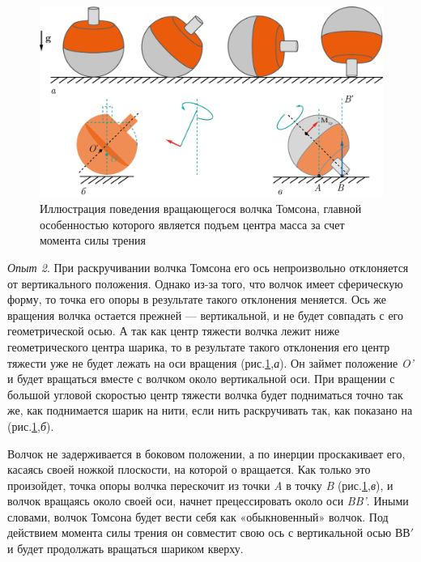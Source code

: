 \documentclass[14pt,a4paper,oneside]{extarticle}	%
\begin{document}
					\begin{figure}[H] 	
						\centering 	
						\includegraphics[width=0.9\linewidth]{gyro-7.png}
						\caption{Иллюстрация поведения вращающегося волчка Томсона, главной особенностью которого является подъем центра масса за счет момента силы трения}
						\label{gyro-7}
					\end{figure}
								
			\textit{Опыт 2}. При раскручивании волчка Томсона его ось непроизвольно отклоняется от вертикального положения.
			Однако из-за того, что волчок имеет сферическую форму, то точка его опоры в результате такого отклонения меняется.
			Ось же вращения волчка остается прежней — вертикальной, и не будет совпадать с его геометрической осью. 
			А так как центр тяжести волчка лежит ниже геометрического центра шарика, то в результате такого отклонения его центр тяжести уже не будет лежать на оси вращения (рис.\ref{gyro-7},\textit{а}).
			Он займет положение \textit{O'} и будет вращаться вместе с волчком около вертикальной оси.
			При вращении с большой угловой скоростью центр тяжести волчка будет подниматься точно так же, как поднимается шарик на нити, если нить раскручивать так, как показано на (рис.\ref{gyro-7},\textit{б}).	
			
					
			Волчок не задерживается в боковом положении, а по инерции проскакивает его, касаясь своей ножкой плоскости, на которой о вращается.
			Как только это произойдет, точка опоры волчка перескочит из точки  \textit{A} в точку  \textit{B} (рис.\ref{gyro-7},\textit{в}), и волчок вращаясь около своей оси, начнет прецессировать около оси \textit{BB'}. 
			Иными словами, волчок Томсона будет вести себя как «обыкновенный» волчок. 
			Под действием момента силы трения он совместит свою ось с вертикальной осью $ \text{ВВ}' $ и будет продолжать вращаться шариком кверху. 
			
\end{document}
